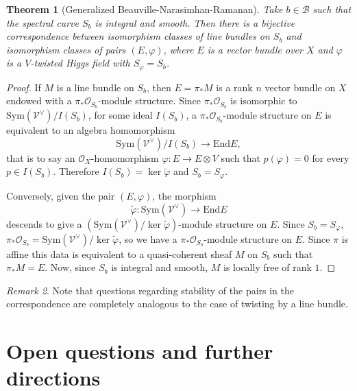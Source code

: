 \documentclass[12pt,a4paper]{book}
\newtheorem{thm}{Theorem}[section]
\theoremstyle{definition} \newtheorem{defn}[thm]{Definition}
\theoremstyle{definition} \newtheorem{ejemplo}[thm]{Example}
\theoremstyle{remark} \newtheorem{rem}[thm]{Remark}
\def\OO{\mathscr{O}}
\def\BB{\mathscr{B}}
\def\VV{\mathscr{V}}
\def\End{\mathrm{End}}
\def\Sym{\mathrm{Sym}}
\begin{document}
  \begin{thm}[Generalized Beauville-Narasimhan-Ramanan]
    Take $b\in \BB$ such that the spectral curve $S_b$ is integral and smooth. Then there is a bijective correspondence between isomorphism classes of line bundles on $S_b$ and isomorphism classes of pairs $(E,\varphi)$, where $E$ is a vector bundle over $X$ and $\varphi$ is a $V$-twisted Higgs field with $S_\varphi = S_b$.
  \end{thm}
  \begin{proof}
    If $M$ is a line bundle on $S_b$, then $E=\pi_*M$ is a rank $n$ vector bundle on $X$ endowed with a $\pi_*\OO_{S_b}$-module structure. Since $\pi_*\OO_{S_b}$ is isomorphic to $\Sym(\VV^\vee)/I(S_b)$, for some ideal $I(S_b)$, a $\pi_*\OO_{S_b}$-module structure on $E$ is equivalent to an algebra homomorphism
    \begin{equation*}
      \Sym(\VV^\vee)/I(S_b) \rightarrow \End E,
    \end{equation*}
    that is to say an $\OO_X$-homomorphism $\varphi:E\rightarrow E\otimes V$ such that $p(\varphi)=0$ for every $p \in I(S_b)$. Therefore $I(S_b)=\ker \tilde{\varphi}$ and $S_b=S_\varphi$.

    Conversely, given the pair $(E,\varphi)$, the morphism
    \begin{equation*}
      \tilde{\varphi}:\Sym(\VV^\vee) \longrightarrow \End E
    \end{equation*}
    descends to give a $(\Sym(\VV^\vee)/\ker \tilde{\varphi})$-module structure on $E$. Since $S_b=S_\varphi$, $\pi_*\OO_{S_b}=\Sym(\VV^\vee)/\ker \tilde{\varphi}$, so we have a $\pi_*\OO_{S_b}$-module structure on $E$. Since $\pi$ is affine this data is equivalent to a quasi-coherent sheaf $M$ on $S_b$ such that $\pi_* M = E$. Now, since $S_b$ is integral and smooth, $M$ is locally free of rank $1$.
  \end{proof}
  \begin{rem}
  Note that questions regarding stability of the pairs in the correspondence are completely analogous to the case of twisting by a line bundle.
  \end{rem}

  \section{Open questions and further directions}
\end{document}
